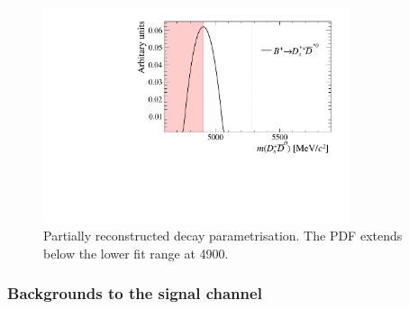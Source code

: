 \begin{figure}[!h]
    \centering
    \includegraphics[width=0.80\textwidth]{figs/B2DsPhi/DsstarDstar0_part_reco_Shapes.pdf}
    \caption{Partially reconstructed \decay{\Bp}{\Dssp\Dstarzb} decay parametrisation. The PDF extends below the lower fit range at 4900\mevcc.}
    \label{fig:B2DsPhi_DsstarDstar0_partreco}   
\end{figure}



\subsubsection{Backgrounds to the signal channel}




